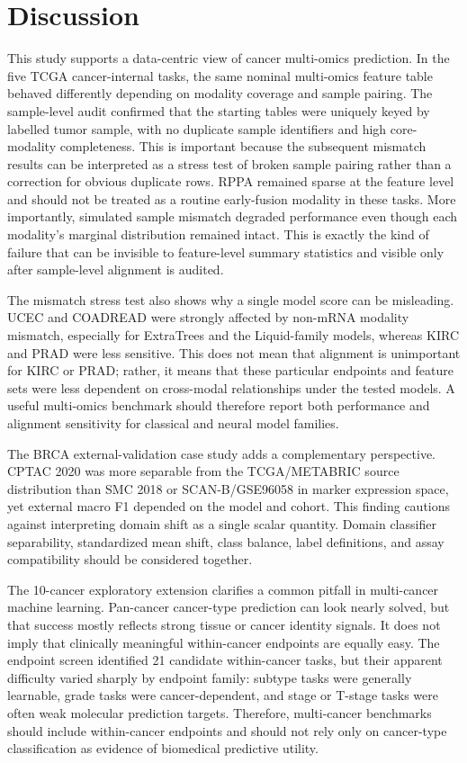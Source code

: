 \section{Discussion}

This study supports a data-centric view of cancer multi-omics prediction. In the five TCGA cancer-internal tasks, the same nominal multi-omics feature table behaved differently depending on modality coverage and sample pairing. The sample-level audit confirmed that the starting tables were uniquely keyed by labelled tumor sample, with no duplicate sample identifiers and high core-modality completeness. This is important because the subsequent mismatch results can be interpreted as a stress test of broken sample pairing rather than a correction for obvious duplicate rows. RPPA remained sparse at the feature level and should not be treated as a routine early-fusion modality in these tasks. More importantly, simulated sample mismatch degraded performance even though each modality's marginal distribution remained intact. This is exactly the kind of failure that can be invisible to feature-level summary statistics and visible only after sample-level alignment is audited.

The mismatch stress test also shows why a single model score can be misleading. UCEC and COADREAD were strongly affected by non-mRNA modality mismatch, especially for ExtraTrees and the Liquid-family models, whereas KIRC and PRAD were less sensitive. This does not mean that alignment is unimportant for KIRC or PRAD; rather, it means that these particular endpoints and feature sets were less dependent on cross-modal relationships under the tested models. A useful multi-omics benchmark should therefore report both performance and alignment sensitivity for classical and neural model families.

The BRCA external-validation case study adds a complementary perspective. CPTAC 2020 was more separable from the TCGA/METABRIC source distribution than SMC 2018 or SCAN-B/GSE96058 in marker expression space, yet external macro F1 depended on the model and cohort. This finding cautions against interpreting domain shift as a single scalar quantity. Domain classifier separability, standardized mean shift, class balance, label definitions, and assay compatibility should be considered together.

The 10-cancer exploratory extension clarifies a common pitfall in multi-cancer machine learning. Pan-cancer cancer-type prediction can look nearly solved, but that success mostly reflects strong tissue or cancer identity signals. It does not imply that clinically meaningful within-cancer endpoints are equally easy. The endpoint screen identified 21 candidate within-cancer tasks, but their apparent difficulty varied sharply by endpoint family: subtype tasks were generally learnable, grade tasks were cancer-dependent, and stage or T-stage tasks were often weak molecular prediction targets. Therefore, multi-cancer benchmarks should include within-cancer endpoints and should not rely only on cancer-type classification as evidence of biomedical predictive utility.

